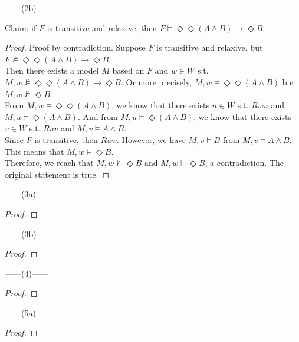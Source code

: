 \documentclass[12pt]{article}
\newcommand{\D}{\Diamond}
\newcommand{\s}{\vDash}
\newcommand{\ns}{\nvDash}
\begin{document}
\noindent
\begin{center}
    ------(2b)------
\end{center}
Claim: if $F$ is transitive and relaxive, then $F \s \D \D (A \land B) \to \D B$.
\begin{proof} Proof by contradiction.
    Suppose $F$ is transitive and relaxive, but $F \ns \D \D (A \land B) \to \D B$.\\
    Then there exists a model $M$ based on $F$ and $w \in W$ s.t. $M, w \ns \D \D (A \land B) \to \D B$.
    Or more precisely, $M, w \s \D \D (A \land B)$ but $M, w \ns \D B$.\\
    From $M, w \s \D \D (A \land B)$, we know that there exists $u \in W$ s.t. $Rwu$ and $M, u \s \D (A \land B)$.
    And from $M, u \s \D (A \land B)$, we know that there exists $v \in W$ s.t. $Ruv$ and $M, v \s A \land B$.\\
    Since $F$ is transitive, then $Rwv$. However, we have $M,v \s B$ from $M, v \s A \land B$.
    This means that $M, w \s \D B$.\\
    Therefore, we reach that $M, w \ns \D B$ and $M, w \s \D B$, a contradiction.
    The original statement is true.
\end{proof}

\newpage
\noindent
\begin{center}
    ------(3a)------
\end{center} 
\begin{proof}
    
\end{proof}

\noindent
\begin{center}
    ------(3b)------
\end{center} 
\begin{proof}
    
\end{proof}


\newpage
\noindent
\begin{center}
    ------(4)------
\end{center} 
\begin{proof}
    
\end{proof}


\newpage
\noindent
\begin{center}
    ------(5a)------
\end{center} 
\begin{proof}
    
\end{proof}
\end{document}
